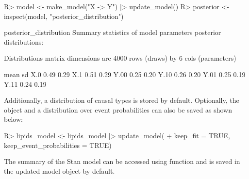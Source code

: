 \documentclass[
  11pt,
  article]{jss}
\renewcommand{\texttt}[1]{\code{#1}}
\begin{document}
\begin{CodeChunk}
\begin{CodeInput}
R> model <- make_model("X -> Y") |> update_model()
R> posterior <- inspect(model, "posterior_distribution")  
\end{CodeInput}

\begin{CodeOutput}

posterior_distribution
Summary statistics of model parameters posterior distributions:

  Distributions matrix dimensions are 
  4000 rows (draws) by 6 cols (parameters)

     mean   sd
X.0  0.49 0.29
X.1  0.51 0.29
Y.00 0.25 0.20
Y.10 0.26 0.20
Y.01 0.25 0.19
Y.11 0.24 0.19
\end{CodeOutput}
\end{CodeChunk}

Additionally, a distribution of causal types is stored by default.
Optionally, the \texttt{stanfit} object and a distribution over event
probabilities can also be saved as shown below:

\begin{CodeInput}
R> lipids_model <- lipids_model |> update_model(
+    keep_fit = TRUE, keep_event_probabilities = TRUE)
\end{CodeInput}

The summary of the Stan model can be accessed using \texttt{inspect()}
function and is saved in the updated model object by default.
\end{document}
